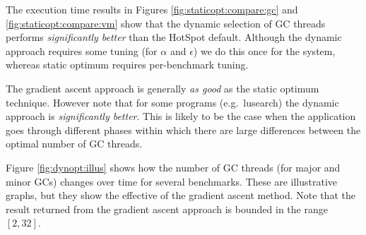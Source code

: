 The execution time results in Figures \ref{fig:staticopt:compare:gc} and 
\ref{fig:staticopt:compare:vm} show that the dynamic selection of GC threads performs \emph{significantly better} than the HotSpot default. 
Although the dynamic approach requires some tuning (for $\alpha$ and $\epsilon$) we do this once for the system, whereas static optimum requires 
per-benchmark tuning.

The gradient ascent approach is generally \emph{as good} as the static optimum technique.
However note that for some programs (e.g.\ lusearch) the dynamic approach
is \emph{significantly better}. This is likely to be the case when the 
application goes through different phases within which there are large differences between the optimal number of GC threads.

Figure \ref{fig:dynopt:illus} shows how the number of GC threads (for major and minor GCs) changes over time for several benchmarks.
These are illustrative graphs, but they show the
effective of the gradient ascent method. Note that the result returned from the gradient ascent approach is bounded in the range $[2,32]$.